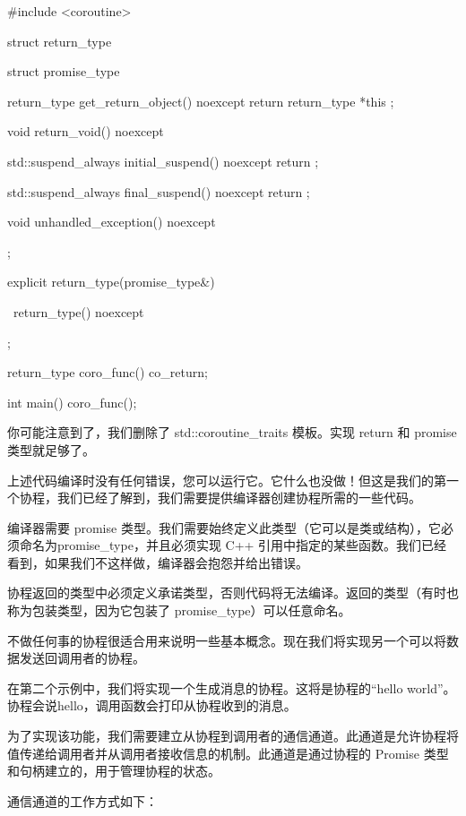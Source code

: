 \begin{cpp}
#include <coroutine>

struct return_type {
    struct promise_type {
        return_type get_return_object() noexcept {
            return return_type{ *this };
        }

        void return_void() noexcept {}

        std::suspend_always initial_suspend() noexcept {
            return {};
        }

        std::suspend_always final_suspend() noexcept {
            return {};
        }

        void unhandled_exception() noexcept {}
    };

    explicit return_type(promise_type&) {
    }

    ~return_type() noexcept {
    }
};

return_type coro_func() {
    co_return;
}

int main() {
    coro_func();
}
\end{cpp}

你可能注意到了，我们删除了 std::coroutine\_traits 模板。实现 return 和 promise 类型就足够了。

上述代码编译时没有任何错误，您可以运行它。它什么也没做！但这是我们的第一个协程，我们已经了解到，我们需要提供编译器创建协程所需的一些代码。


编译器需要 promise 类型。我们需要始终定义此类型（它可以是类或结构），它必须命名为promise\_type，并且必须实现 C++ 引用中指定的某些函数。我们已经看到，如果我们不这样做，编译器会抱怨并给出错误。

协程返回的类型中必须定义承诺类型，否则代码将无法编译。返回的类型（有时也称为包装类型，因为它包装了 promise\_type）可以任意命名。


不做任何事的协程很适合用来说明一些基本概念。现在我们将实现另一个可以将数据发送回调用者的协程。

在第二个示例中，我们将实现一个生成消息的协程。这将是协程的“hello world”。协程会说hello，调用函数会打印从协程收到的消息。

为了实现该功能，我们需要建立从协程到调用者的通信通道。此通道是允许协程将值传递给调用者并从调用者接收信息的机制。此通道是通过协程的 Promise 类型和句柄建立的，用于管理协程的状态。

通信通道的工作方式如下：

